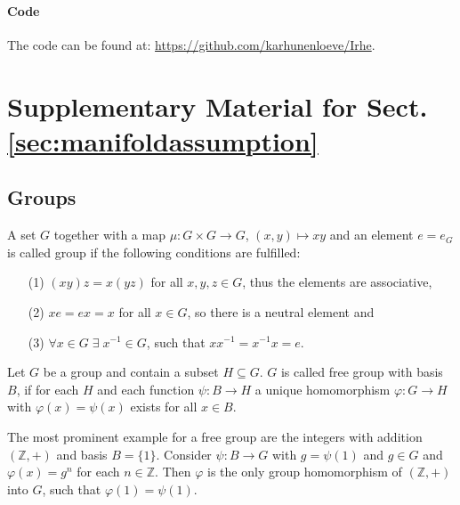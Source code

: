 \documentclass[envcountsect,runningheads]{llncs}
\begin{document}
\paragraph{Code} The code can be found at: \href{https://github.com/karhunenloeve/Irhe}{https://github.com/karhunenloeve/Irhe}.
%
%
%
%
%
%
%
\newpage
\appendix
\section{Supplementary Material for Sect. \ref{sec:manifoldassumption}}
\label{a:mannilliegroup}
\subsection{Groups}
\label{a:groups}
\begin{definition}
A set $G$ together with a map $\mu: G \times G \rightarrow G$, $(x,y) \mapsto xy$ and an element $e = e_G$ is called group if the following conditions are fulfilled:
\begin{enumerate}
	\item[(1)] $(xy)z = x(yz)$ for all $x,y,z \in G$, thus the elements are associative,
	\item[(2)] $xe = ex = x$ for all $x \in G$, so there is a neutral element and
	\item[(3)] $\forall x \in G \; \exists \; x^{-1} \in G$, such that $xx^{-1} = x^{-1}x = e$. 
\end{enumerate}
\end{definition}

\begin{definition}{\cite[p.~196]{hilton2012course}}
Let $G$ be a group and contain a subset $H \subseteq G$. $G$ is called free group with basis $B$, if for each $H$ and each function $\psi: B \rightarrow H$ a unique homomorphism $\varphi: G \rightarrow H$ with $\varphi(x) = \psi(x)$ exists for all $x \in B$.
\end{definition}

\begin{example}
The most prominent example for a free group are the integers with addition $(\mathbb{Z},+)$ and basis $B = \{1\}$. Consider $\psi: B \rightarrow G$ with $g = \psi(1)$ and $g \in G$ and $\varphi(x) = g^n$ for each $n \in \mathbb{Z}$. Then $\varphi$ is the only group homomorphism of $(\mathbb{Z},+)$ into $G$, such that $\varphi(1)=\psi(1)$.
\end{example}
\end{document}

